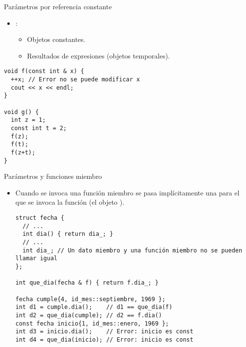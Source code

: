 \begin{frame}[t,fragile]{Parámetros por referencia constante}
\begin{itemize}
  \item {}:
    \begin{itemize}
      \item Objetos constantes.
      \item Resultados de expresiones (objetos temporales).
    \end{itemize}
\end{itemize}
\begin{lstlisting}
void f(const int & x) {
  ++x; // Error no se puede modificar x
  cout << x << endl;
}

void g() {
  int z = 1;
  const int t = 2;
  f(z);
  f(t); 
  f(z+t); 
}
\end{lstlisting}
\end{frame}

\begin{frame}[fragile]{Parámetros y funciones miembro}
\begin{itemize}
  \item Cuando se invoca una función miembro se pasa implícitamente una 
         para el que se invoca la función 
        (el objeto ).
\begin{lstlisting}
struct fecha {
  // ...
  int dia() { return dia_; }
  // ...
  int dia_; // Un dato miembro y una función miembro no se pueden llamar igual
};

int que_dia(fecha & f) { return f.dia_; }

fecha cumple{4, id_mes::septiembre, 1969 };
int d1 = cumple.dia();    // d1 == que_dia(f)
int d2 = que_dia(cumple); // d2 == f.dia()
const fecha inicio{1, id_mes::enero, 1969 };
int d3 = inicio.dia();    // Error: inicio es const
int d4 = que_dia(inicio); // Error: inicio es const
\end{lstlisting}
\end{itemize}
\end{frame}

